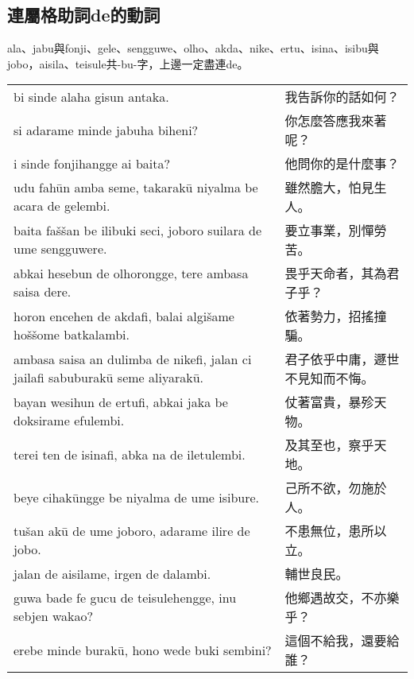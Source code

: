 \documentclass{article}
\begin{document}
\subsection{連屬格助詞de的動詞}
\noindent ala、jabu與fonji、gele、sengguwe、olho、akda、nike、ertu、isina、isibu與jobo，aisila、teisule共-bu-字，上邊一定盡連de。
\begin{center}
    \begin{tabularx}{\textwidth}{XX}
        bi sinde alaha gisun antaka. & 我告訴你的話如何？\\
        si adarame minde jabuha biheni? & 你怎麼答應我來著呢？\\
        i sinde fonjihangge ai baita? & 他問你的是什麼事？\\
        udu fah\={u}n amba seme, takarak\={u} niyalma be acara de gelembi. & 雖然膽大，怕見生人。\\
        baita fa\v{s}\v{s}an be ilibuki seci, joboro suilara de ume sengguwere. & 要立事業，別憚勞苦。\\
        abkai hesebun de olhorongge, tere ambasa saisa dere. & 畏乎天命者，其為君子乎？\\
        horon encehen de akdafi, balai algi\v{s}ame ho\v{s}\v{s}ome batkalambi. & 依著勢力，招搖撞騙。\\
        ambasa saisa an dulimba de nikefi, jalan ci jailafi sabuburak\={u} seme aliyarak\={u}. & 君子依乎中庸，遯世不見知而不悔。\\
        bayan wesihun de ertufi, abkai jaka be doksirame efulembi. & 仗著富貴，暴殄天物。\\
        terei ten de isinafi, abka na de iletulembi. & 及其至也，察乎天地。\\
        beye cihak\={u}ngge be niyalma de ume isibure. & 己所不欲，勿施於人。\\
        tu\v{s}an ak\={u} de ume joboro, adarame ilire de jobo. & 不患無位，患所以立。\\
        jalan de aisilame, irgen de dalambi. & 輔世良民。\\
        guwa bade fe gucu de teisulehengge, inu sebjen wakao? & 他鄉遇故交，不亦樂乎？\\
        erebe minde burak\={u}, hono wede buki sembini? & 這個不給我，還要給誰？
    \end{tabularx}
\end{center}
\end{document}
